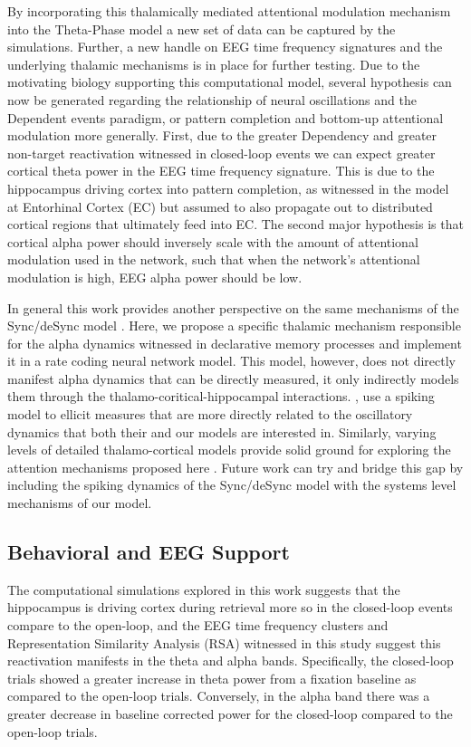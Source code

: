 \documentclass[11pt, titlepage, twoside]{article}
\begin{document}
By incorporating this thalamically mediated attentional modulation mechanism into the Theta-Phase model a new set of data can be captured by the simulations.  Further, a new handle on EEG time frequency signatures and the underlying thalamic mechanisms is in place for further testing.  Due to the motivating biology supporting this computational model, several hypothesis can now be generated regarding the relationship of neural oscillations and the Dependent events paradigm, or pattern completion and bottom-up attentional modulation more generally.  First, due to the greater Dependency and greater non-target reactivation witnessed in closed-loop events we can expect greater cortical theta power in the EEG time frequency signature.  This is due to the hippocampus driving cortex into pattern completion, as witnessed in the model at Entorhinal Cortex (EC) but assumed to also propagate out to distributed cortical regions that ultimately feed into EC.  The second major hypothesis is that cortical alpha power should inversely scale with the amount of attentional modulation used in the network, such that when the network's attentional modulation is high, EEG alpha power should be low.  

In general this work provides another perspective on the same mechanisms of the Sync/deSync model \cite{ParishHanslmayrBowman18}.  Here, we propose a specific thalamic mechanism responsible for the alpha dynamics witnessed in declarative memory processes and implement it in a rate coding neural network model.  This model, however, does not directly manifest alpha dynamics that can be directly measured, it only indirectly models them through the thalamo-coritical-hippocampal interactions.  \textcite{ParishHanslmayrBowman18}, use a spiking model to ellicit measures that are more directly related to the oscillatory dynamics that both their and our models are interested in.  Similarly, varying levels of detailed thalamo-cortical models provide solid ground for exploring the attention mechanisms proposed here \cite{HindriksvanPutten13, BeckerKnockRitterEtAl15}.   Future work can try and bridge this gap by including the spiking dynamics of the Sync/deSync model with the systems level mechanisms of our model.

\subsection{Behavioral and EEG Support}
The computational simulations explored in this work suggests that the hippocampus is driving cortex during retrieval more so in the closed-loop events compare to the open-loop, and the EEG time frequency clusters and Representation Similarity Analysis (RSA) witnessed in this study suggest this reactivation manifests in the theta and alpha bands.   Specifically, the closed-loop trials showed a greater increase in theta power from a fixation baseline as compared to the open-loop trials.  Conversely, in the alpha band there was a greater decrease in baseline corrected power for the closed-loop compared to the open-loop trials.  
\end{document}
